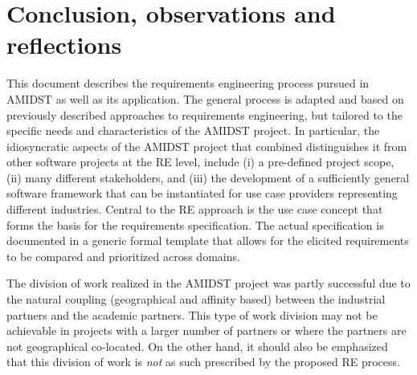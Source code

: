 \section{Conclusion, observations and reflections} 
\label{sec:conclusion}

This document describes the requirements engineering process pursued in AMIDST as well as its application. The general process is  adapted and based
on previously described approaches to requirements engineering, but tailored to the specific needs and characteristics of the AMIDST
project. In particular, the idiosyncratic aspects of the AMIDST project that combined distinguishes it from other software
projects at the RE level, include (i) a pre-defined project scope, (ii) many different
stakeholders, and (iii) the development of a sufficiently general software framework that can be instantiated for
use case providers representing different industries.  Central to the RE approach is the use case
concept that forms the basis for the requirements specification. The actual specification is documented in a generic
formal template that allows for the elicited requirements to be compared and prioritized across domains. 

The division of work realized in the AMIDST project was partly successful due to the natural coupling (geographical and
affinity based) between the industrial partners and the academic partners. This type of work division may not be
achievable in projects with a larger number of partners or where the partners are not geographical co-located. On the
other hand, it should also be emphasized that this division of work is \emph{not} as such prescribed by the proposed
RE process. 
